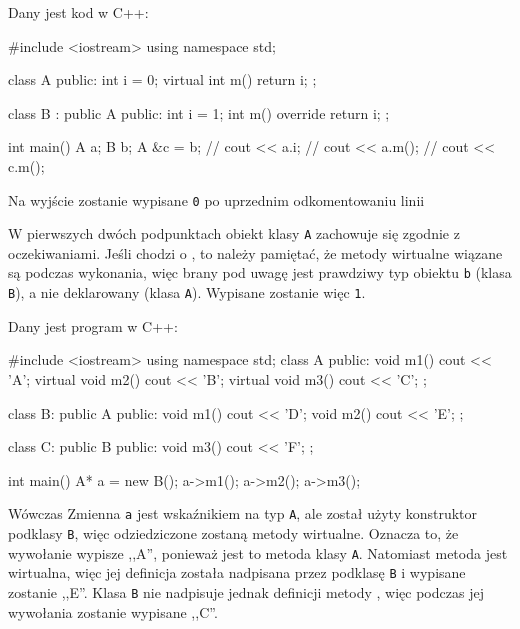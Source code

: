 \begin{solutions}

\sol Dany jest kod w C++:
\begin{cpp}
    #include <iostream>
    using namespace std;
    
    class A {
    public:
        int i = 0;
        virtual int m() { return i; }
    };
    
    class B : public A {
    public:
        int i = 1;
        int m() override { return i; }
    };
    
    int main() {
        A a;
        B b;
        A &c = b;
        // cout << a.i;
        // cout << a.m();
        // cout << c.m();
    }
\end{cpp}
Na wyjście zostanie wypisane \texttt{0} po uprzednim odkomentowaniu linii

W pierwszych dwóch podpunktach obiekt klasy \texttt{A} zachowuje się zgodnie z oczekiwaniami. Jeśli chodzi o , to należy pamiętać, że metody wirtualne wiązane są podczas wykonania, więc brany pod uwagę jest prawdziwy typ obiektu \texttt{b} (klasa \texttt{B}), a nie deklarowany (klasa \texttt{A}). Wypisane zostanie więc \texttt{1}.

\sol Dany jest program w C++:
\begin{cpp}
    #include <iostream>
    using namespace std;
    class A {
    public:
        void m1() { cout << 'A'; }
        virtual void m2() { cout << 'B'; }
        virtual void m3() { cout << 'C'; }
    };
    
    class B: public A {
    public:
        void m1() { cout << 'D'; }
        void m2() { cout << 'E'; }
    };
    
    class C: public B {
    public:
        void m3() { cout << 'F'; }
    };
    
    int main() {
        A* a = new B();
        a->m1();
        a->m2();
        a->m3();
    }
\end{cpp}
Wówczas
Zmienna \texttt{a} jest wskaźnikiem na typ \texttt{A}, ale został użyty konstruktor podklasy \texttt{B}, więc odziedziczone zostaną metody wirtualne. Oznacza to, że wywołanie  wypisze ,,A'', ponieważ jest to metoda klasy \texttt{A}. Natomiast metoda  jest wirtualna, więc jej definicja została nadpisana przez podklasę \texttt{B} i wypisane zostanie ,,E''. Klasa \texttt{B} nie nadpisuje jednak definicji metody , więc podczas jej wywołania zostanie wypisane ,,C''.


\end{solutions}
